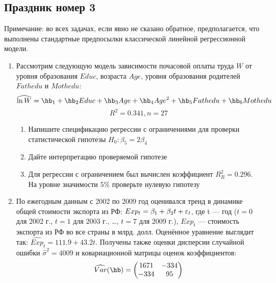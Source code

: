 \documentclass[12pt, a4paper]{article}
\theoremstyle{definition}
\begin{document}
\subsection{Праздник номер 3}
Примечание: во всех задачах, если явно не сказано обратное, предполагается, что выполнены стандартные предпосылки классической линейной регрессионной модели.

\begin{enumerate}

\item  Рассмотрим следующую модель зависимости почасовой оплаты труда $W$ от уровня образования $Educ$, возраста $Age$, уровня образования родителей $Fathedu$ и $Mothedu$:
\[
\widehat{\ln W} = \hb_1 + \hb_2 Educ + \hb_3 Age + \hb_4 Age^2+ \hb_5 Fathedu + \hb_6 Mothedu
\]
\[
R^2 = 0.341, n = 27
\]
\begin{enumerate}
\item Напишите спецификацию регрессии с ограничениями для проверки статистической гипотезы $H_0: \beta_5 = 2\beta_4$
\item Дайте интерпретацию проверяемой гипотезе
\item Для регрессии с ограничением был вычислен коэффициент $R_{R}^2 = 0.296$. На уровне значимости $5\%$ проверьте нулевую гипотезу
\end{enumerate}



\item По ежегодным данным с 2002 по 2009 год оценивался тренд в динамике общей стоимости экспорта из РФ: $Exp_t=\beta_1+\beta_2t+\varepsilon_t$, где t — год ($t=0$ для 2002 г., $t=1$ для 2003 г., \ldots, $t=7$
для 2009 г.), $Exp_t$ — стоимость экспорта из РФ во все страны в млрд. долл. Оценённое уравнение  выглядит так: $\widehat{Exp}_t=111.9+43.2t$. Получены также оценки дисперсии случайной ошибки $\hat{\sigma}^2=4009$ и ковариационной матрицы оценок коэффициентов:
\[
\widehat{Var}(\hb)=\begin{pmatrix}
1671 & -334 \\
-334 & 95
\end{pmatrix}
\]


\end{enumerate}
\end{document}
